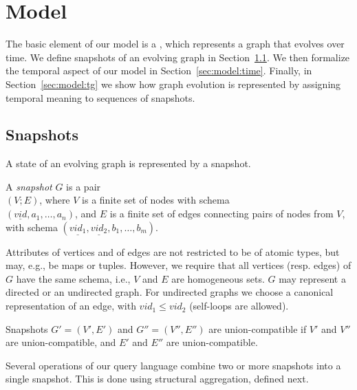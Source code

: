 \section{Model}
\label{sec:model}

The basic element of our model is a \tg, which represents a graph that
evolves over time.  We define snapshots of an evolving graph in
Section~\ref{sec:model:structure}.  We then formalize the temporal
aspect of our model in Section~\ref{sec:model:time}.  Finally, in
Section~\ref{sec:model:tg} we show how graph evolution is represented
by assigning temporal meaning to sequences of snapshots.

\subsection{Snapshots}
\label{sec:model:structure}

A state of an evolving graph is represented by a snapshot.

\begin{definition}[Snapshot]
A {\em snapshot} $G$ is a pair\\ $(V; E)$, where $V$ is a finite set of
nodes with schema\\ $(\underline{vid}, a_1, \ldots, a_n)$, and $E$ is a
finite set of edges connecting pairs of nodes from $V$, with schema
$(\underline{vid_1}, \underline{vid_2}, b_1, \ldots, b_m)$.
\label{def:sg} 
\vspace{-0.3cm}
\end{definition}

Attributes of vertices and of edges are not restricted to be of atomic
types, but may, e.g., be maps or tuples. However, we require that all
vertices (resp. edges) of $G$ have the same schema, i.e., $V$ and $E$
are homogeneous sets. $G$ may represent a directed or an undirected
graph.  For undirected graphs we choose a canonical representation of
an edge, with $vid_1 \leq vid_2$ (self-loops are allowed).

\begin{definition} 
Snapshots $G' = (V', E')$ and $G'' = (V'', E'')$ are
union-compatible if $V'$ and $V''$ are union-compatible, and $E'$
and $E''$ are union-compatible.
\label{def:scompat}
\end{definition}

Several operations of our query language combine two or more snapshots
into a single snapshot. This is done using structural aggregation,
defined next.

